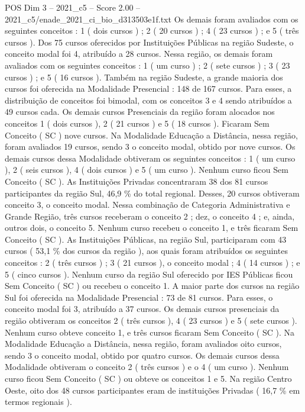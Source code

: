\begin{textsample}{POS Dim 3 – 2021\_c5 – Score 2.00 – 2021\_c5/enade\_2021\_ci\_bio\_d313503e1f.txt}
Os demais foram avaliados com os seguintes conceitos : 1 ( dois cursos ) ; 2 ( 20 cursos ) ; 4 ( 23 cursos ) ; e 5 ( três cursos ).
Dos 75 cursos oferecidos por Instituições Públicas na região Sudeste, o conceito modal foi 4, atribuído a 28 cursos.
Nessa região, os demais foram avaliados com os seguintes conceitos : 1 ( um curso ) ; 2 ( sete cursos ) ; 3 ( 23 cursos ) ; e 5 ( 16 cursos ).
Também na região Sudeste, a grande maioria dos cursos foi oferecida na Modalidade Presencial : 148 de 167 cursos.
Para esses, a distribuição de conceitos foi bimodal, com os conceitos 3 e 4 sendo atribuídos a 49 cursos cada.
Os demais cursos Presenciais da região foram alocados nos conceitos 1 ( dois cursos ), 2 ( 21 cursos ) e 5 ( 18 cursos ).
Ficaram Sem Conceito ( SC ) nove cursos.
Na Modalidade Educação a Distância, nessa região, foram avaliados 19 cursos, sendo 3 o conceito modal, obtido por nove cursos.
Os demais cursos dessa Modalidade obtiveram os seguintes conceitos : 1 ( um curso ), 2 ( seis cursos ), 4 ( dois cursos ) e 5 ( um curso ).
Nenhum curso ficou Sem Conceito ( SC ).
As Instituições Privadas concentraram 38 dos 81 cursos participantes da região Sul, 46,9 \% do total regional.
Desses, 20 cursos obtiveram conceito 3, o conceito modal.
Nessa combinação de Categoria Administrativa e Grande Região, três cursos receberam o conceito 2 ; dez, o conceito 4 ; e, ainda, outros dois, o conceito 5.
Nenhum curso recebeu o conceito 1, e três ficaram Sem Conceito ( SC ).
As Instituições Públicas, na região Sul, participaram com 43 cursos ( 53,1 \% dos cursos da região ), aos quais foram atribuídos os seguintes conceitos : 2 ( três cursos ) ; 3 ( 21 cursos ), o conceito modal ; 4 ( 14 cursos ) ; e 5 ( cinco cursos ).
Nenhum curso da região Sul oferecido por IES Públicas ficou Sem Conceito ( SC ) ou recebeu o conceito 1.
A maior parte dos cursos na região Sul foi oferecida na Modalidade Presencial : 73 de 81 cursos.
Para esses, o conceito modal foi 3, atribuído a 37 cursos.
Os demais cursos presenciais da região obtiveram os conceitos 2 ( três cursos ), 4 ( 23 cursos ) e 5 ( sete cursos ).
Nenhum curso obteve conceito 1, e três cursos ficaram Sem Conceito ( SC ).
Na Modalidade Educação a Distância, nessa região, foram avaliados oito cursos, sendo 3 o conceito modal, obtido por quatro cursos.
Os demais cursos dessa Modalidade obtiveram o conceito 2 ( três cursos ) e o 4 ( um curso ).
Nenhum curso ficou Sem Conceito ( SC ) ou obteve os conceitos 1 e 5.
Na região Centro Oeste, oito dos 48 cursos participantes eram de instituições Privadas ( 16,7 \% em termos regionais ).

\end{textsample}
